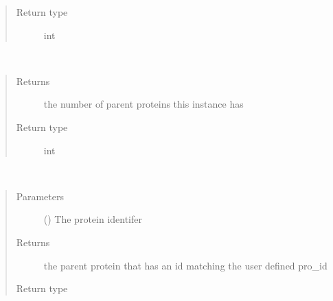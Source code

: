 \documentclass[letterpaper,10pt,english]{sphinxmanual}
\begin{document}
\begin{fulllineitems}
\begin{fulllineitems}
\begin{quote}
\begin{description}
\item[{Return type}] \leavevmode
int

\end{description}\end{quote}

\end{fulllineitems}


\begin{fulllineitems}
\label{\detokenize{IPTK.Classes:IPTK.Classes.Peptide.Peptide.get_number_parent_protein}}~\begin{quote}\begin{description}
\item[{Returns}] \leavevmode
the number of parent proteins this instance has

\item[{Return type}] \leavevmode
int

\end{description}\end{quote}

\end{fulllineitems}


\begin{fulllineitems}
\label{\detokenize{IPTK.Classes:IPTK.Classes.Peptide.Peptide.get_parent}}~\begin{quote}\begin{description}
\item[{Parameters}] \leavevmode
{} () \textendash{} The protein identifer

\item[{Returns}] \leavevmode
the parent protein that has an id matching the user defined pro\_id

\item[{Return type}] \leavevmode
{\hyperref[\detokenize{IPTK.Classes:IPTK.Classes.Protein.Protein}]{}}


\end{description}
\end{quote}
\end{fulllineitems}
\end{fulllineitems}
\end{document}
